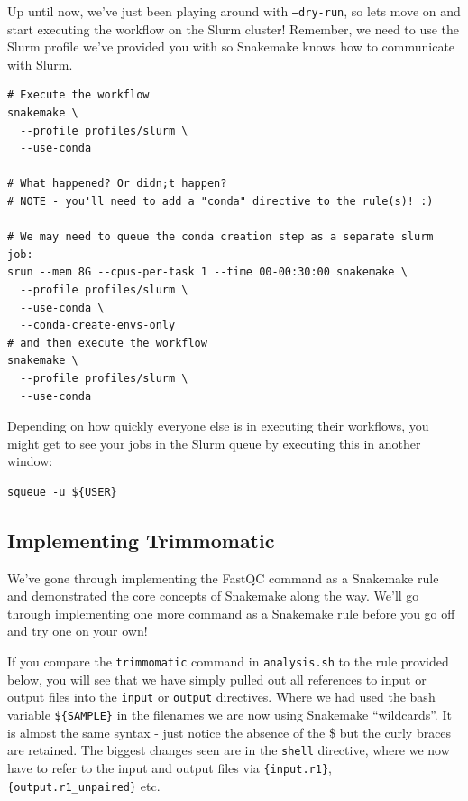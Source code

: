 Up until now, we've just been playing around with \texttt{--dry-run}, so lets move on and start executing the workflow on the Slurm cluster!
Remember, we need to use the Slurm profile we've provided you with so Snakemake knows how to communicate with Slurm.

\begin{lstlisting}
# Execute the workflow
snakemake \
  --profile profiles/slurm \
  --use-conda

# What happened? Or didn;t happen?
# NOTE - you'll need to add a "conda" directive to the rule(s)! :)

# We may need to queue the conda creation step as a separate slurm job:
srun --mem 8G --cpus-per-task 1 --time 00-00:30:00 snakemake \
  --profile profiles/slurm \
  --use-conda \
  --conda-create-envs-only
# and then execute the workflow
snakemake \
  --profile profiles/slurm \
  --use-conda
\end{lstlisting}

Depending on how quickly everyone else is in executing their workflows, you might get to see your jobs in the Slurm queue by executing this in another window:

\begin{lstlisting}
squeue -u ${USER}
\end{lstlisting}

\subsection{Implementing Trimmomatic}

We've gone through implementing the FastQC command as a Snakemake rule and demonstrated the core concepts of
Snakemake along the way. We'll go through implementing one more command as a Snakemake rule before you go
off and try one on your own!

If you compare the \texttt{trimmomatic} command in \texttt{analysis.sh} to the rule provided below, you will
see that we have simply pulled out all references to input or output files into the \texttt{input} or
\texttt{output} directives. Where we had used the bash variable \texttt{\$\{SAMPLE\}} in the filenames we are now
using Snakemake ``wildcards''. It is almost the same syntax - just notice the absence of the \$ but the curly braces
are retained. The biggest changes seen are in the \texttt{shell} directive, where we now have to refer to the input
and output files via \texttt{\{input.r1\}}, \texttt{\{output.r1\_unpaired\}} etc.

